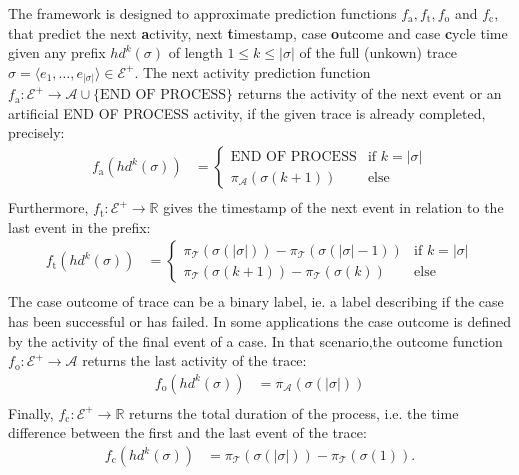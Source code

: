 The framework is designed to approximate prediction functions $f_\mathrm{a}, f_\mathrm{t}, f_\mathrm{o}$ and $f_\mathrm{c}$, that predict the next \textbf{a}ctivity, next \textbf{t}imestamp, case \textbf{o}utcome and case \textbf{c}ycle time given any prefix $hd^k(\sigma)$ of length $1 \leq k \leq |\sigma|$ of the full (unkown) trace $\sigma = \langle e_1, \dots, e_{|\sigma|} \rangle \in \mathcal{E}^+$.
The next activity prediction function $f_\mathrm{a}\colon \mathcal{E}^+ \to \mathcal{A} \cup \{\text{END OF PROCESS}\}$ returns the activity of the next event or an artificial END OF PROCESS activity, if the given trace is already completed, precisely:
\begin{align*}
f_\mathrm{a}(hd^k(\sigma)) &= 
\begin{cases}
	\text{END OF PROCESS}& \text{if $k = |\sigma|$} \\
	\pi_\mathcal{A}(\sigma(k+1)) & \text{else} 
\end{cases}\\
\end{align*}
Furthermore, $f_\mathrm{t} \colon \mathcal{E}^+ \to \mathbb{R}$ gives the timestamp of the next event in relation to the last event in the prefix:
\begin{align*}
f_\mathrm{t}(hd^k(\sigma)) &=
\begin{cases}
\pi_\mathcal{T}(\sigma(|\sigma|)) - \pi_\mathcal{T}(\sigma(|\sigma| - 1))& \text{if $k = |\sigma|$} \\
\pi_\mathcal{T}(\sigma(k+1)) - \pi_\mathcal{T}(\sigma(k)) & \text{else} 
\end{cases}\\
\end{align*}
The case outcome of trace can be a binary label, ie. a label describing if the case has been successful or has failed.
In some applications the case outcome is defined by the activity of the final event of a case.
In that scenario,the outcome function $f_\mathrm{o} \colon \mathcal{E}^+ \to \mathcal{A}$ returns the last activity of the trace:
\begin{align*}
f_\mathrm{o}(hd^k(\sigma)) &= \pi_\mathcal{A}(\sigma(|\sigma|))\\
\end{align*}
Finally, $f_\mathrm{c} \colon \mathcal{E}^+ \to \mathbb{R}$ returns the total duration of the process, i.e. the time difference between the first and the last event of the trace:
\begin{align*}
f_\mathrm{c}(hd^k(\sigma)) &=  \pi_\mathcal{T}(\sigma(|\sigma|))-  \pi_\mathcal{T}(\sigma(1)).
\end{align*}

